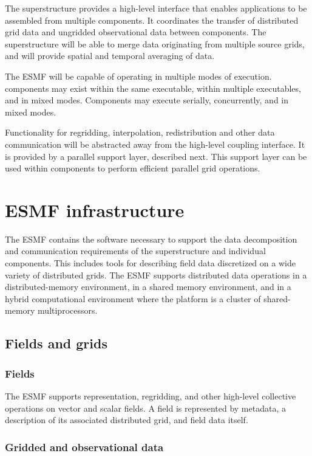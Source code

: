 The superstructure provides a high-level interface that enables 
applications to be assembled from multiple components.  It coordinates
the transfer of distributed grid data and ungridded 
observational data between components.  The superstructure will be able 
to merge data originating from multiple source grids, and will 
provide spatial and temporal averaging of data.

The ESMF will be capable of operating in multiple modes of execution.
components may exist within the same executable, within multiple 
executables, and in mixed modes.  Components may execute serially, 
concurrently, and in mixed modes.  

Functionality for regridding, interpolation, redistribution and other 
data communication will be abstracted away from the high-level coupling
interface.  It is provided by a parallel support layer, described next.  
This support layer can be used within components
to perform efficient parallel grid operations.

\section{ESMF infrastructure}
\label{sec:ESMF_infrastructure}

The ESMF contains the software necessary to support the data
decomposition and communication requirements of the superstructure and
individual components.  This includes tools for describing field
data discretized on a wide variety of distributed grids.  The ESMF
supports distributed data operations in a distributed-memory environment, 
in a shared memory environment, and in a hybrid computational environment 
where the platform is a cluster of shared-memory multiprocessors.

\subsection{Fields and grids}

\subsubsection{Fields}
The ESMF supports representation, regridding, and other high-level
collective operations on vector and scalar fields.  A field is represented 
by metadata, a description of its associated distributed grid, and field 
data itself.

\subsubsection{Gridded and observational data}

